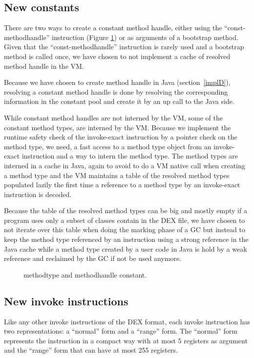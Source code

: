 \documentclass{sig-alternate}
\begin{document}
  \subsection{New constants}

    There are two ways to create a constant method handle, either using the ``const-methodhandle''
    instruction (Figure \ref{MTMHldc}) or as arguments of a bootstrap method.
    Given that the ``const-methodhandle'' instruction is rarely used and
    a bootstrap method is called once, we have chosen to not implement a cache
    of resolved method handle in the VM.

    Because we have chosen to create method handle in Java (section~\ref{implD}),
    resolving a constant method handle is done by resolving the corresponding information
    in the constant pool and create it by an up call to the Java side.

    While constant method handles are not interned by the VM, some of the constant method types,
    are interned by the VM. Because we implement the runtime safety check of the invoke-exact
    instruction by a pointer check on the method type, we need, a fast access to a method type object
    from an invoke-exact instruction and a way to intern the method type.
    The method types are interned in a cache in Java, again to avoid to do a VM native call
    when creating a method type and the VM maintains  a table of the resolved method types
    populated lazily the first time a reference to a method type by an invoke-exact instruction
    is decoded.

    Because the table of the resolved method types can be big and mostly empty if a program
    uses only a subset of classes contain in the DEX file, we have chosen to not iterate over this table when doing
    the marking phase of a GC but instead to keep the method type referenced by an instruction
    using a strong reference in the Java cache while a method type created by a user code in Java
    is hold by a weak reference and reclaimed by the GC if not be used anymore.    

    \begin{figure}[!h]
      \centering \resizebox{1.\linewidth}{!}{}
      \caption{methodtype and methodhandle constant.}\vspace{-1em}
      \label{MTMHldc}
    \end{figure}

  \subsection{New invoke instructions}
    Like any other invoke instructions of the DEX format,
    each invoke instruction has two representations: a ``normal'' form and a ``range'' form.
    The ``normal'' form represents the instruction in a compact way with at most 5 registers as argument 
    and the ``range'' form that can have at most 255 registers.
\end{document}
